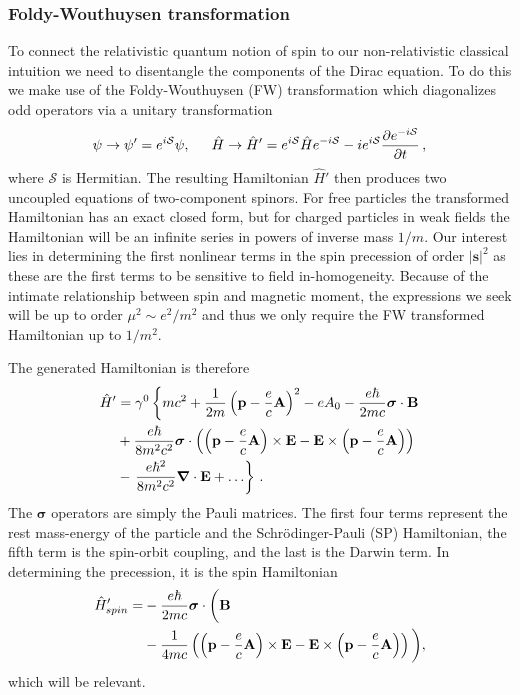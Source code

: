 \subsubsection{Foldy-Wouthuysen transformation}
To connect the relativistic quantum notion of spin to our non-relativistic classical intuition we need to disentangle the components of the Dirac equation. To do this we make use of the Foldy-Wouthuysen (FW) transformation which diagonalizes odd operators via a unitary transformation
\begin{alignat}{1}
  \label{FW01} \psi\rightarrow\psi'=e^{i\mathcal{S}}\psi,\indent\hat{H}\rightarrow\hat{H}'=e^{i\mathcal{S}}\hat{H}e^{-i\mathcal{S}}-ie^{i\mathcal{S}}\frac{\partial e^{-i\mathcal{S}}}{\partial t}\,,
\end{alignat}
where $\mathcal{S}$ is Hermitian. The resulting Hamiltonian $\hat{H}'$ then produces two uncoupled equations of two-component spinors. For free particles the transformed Hamiltonian has an exact closed form, but for charged particles in weak fields the Hamiltonian will be an infinite series in powers of inverse mass $1/m$. Our interest lies in determining the first nonlinear terms in the spin precession of order $|\mathbf{s}|^{2}$ as these are the first terms to be sensitive to field in-homogeneity. Because of the intimate relationship between spin and magnetic moment, the expressions we seek will be up to order $\mu^{2}\sim e^{2}/m^{2}$ and thus we only require the FW transformed Hamiltonian up to $1/m^{2}$.

The generated Hamiltonian is therefore
\begin{alignat}{1}
  \notag\hat{H}'&=\gamma^{0}\left\{mc^{2}+\frac{1}{2m}\left(\mathbf{p}-\frac{e}{c}\mathbf{A}\right)^{2}-eA_{0}-\frac{e\hbar}{2mc}\boldsymbol{\sigma}\cdot\mathbf{B}\right.\\
  \notag&+\frac{e\hbar}{8m^{2}c^{2}}\boldsymbol{\sigma}\cdot\left(\left(\mathbf{p}-\frac{e}{c}\mathbf{A}\right)\times\mathbf{E}-\mathbf{E}\times\left(\mathbf{p}-\frac{e}{c}\mathbf{A}\right)\right)\\
  \label{FW02}&-\left.\frac{e\hbar^{2}}{8m^{2}c^{2}}\boldsymbol{\nabla}\cdot\mathbf{E}+\ldots\right\}\,.
\end{alignat}
The $\boldsymbol{\sigma}$ operators are simply the Pauli matrices. The first four terms represent the rest mass-energy of the particle and the Schr\"{o}dinger-Pauli (SP) Hamiltonian, the fifth term is the spin-orbit coupling, and the last is the Darwin term. In determining the precession, it is the spin Hamiltonian
\begin{alignat}{1}
  \notag\hat{H}'_{spin}=&-\frac{e\hbar}{2mc}\boldsymbol{\sigma}\cdot\bigg(\mathbf{B}\\
  \label{FW03}&-\frac{1}{4mc}\left(\left(\mathbf{p}-\frac{e}{c}\mathbf{A}\right)\times\mathbf{E}-\mathbf{E}\times\left(\mathbf{p}-\frac{e}{c}\mathbf{A}\right)\right)\bigg),
\end{alignat}
which will be relevant.

